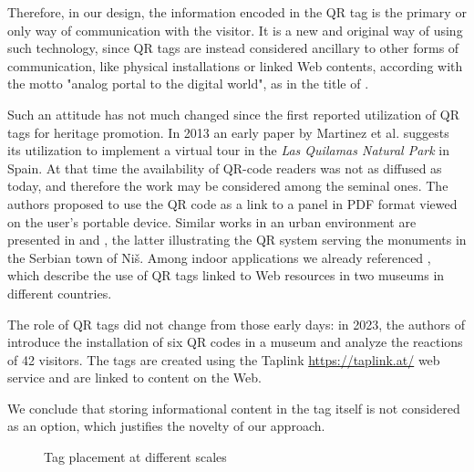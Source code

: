 \documentclass[sustainability,article,submit,pdftex,moreauthors]{Definitions/mdpi}
\begin{document}
Therefore, in our design, the information encoded in the QR tag is the primary or only way of communication with the visitor. It is a new and original way of using such technology, since QR tags are instead considered ancillary to other forms of communication, like physical installations or linked Web contents, according with the motto "analog portal to the digital world", as in the title of \cite{bai12a}. 

Such an attitude has not much changed since the first reported utilization of QR tags for heritage promotion. In 2013 an early paper by Martinez et al. \cite{mar13a} suggests its utilization to implement a virtual tour in the {\em Las Quilamas Natural Park} in Spain. At that time the availability of QR-code readers was not as diffused as today, and therefore the work may be considered among the seminal ones. The authors proposed to use the QR code as a link to a panel in PDF format viewed on the user's portable device. Similar works in an urban environment are presented in \cite{fin13a} and \cite{tat15a}, the latter illustrating the QR system serving the monuments in the Serbian town of Niš. Among indoor applications we already referenced \cite{sol18a}, which describe the use of QR tags linked to Web resources in two museums in different countries.

The role of QR tags did not change from those early days: in 2023, the authors of \cite{pan23a} introduce the installation of six QR codes in a museum and analyze the reactions of 42 visitors. The tags are created using the Taplink \url{https://taplink.at/} web service and are linked to content on the Web. 

We conclude that storing informational content in the tag itself is not considered as an option, which justifies the novelty of our approach.

\begin{figure}
\hfill
{}
\caption{Tag placement at different scales}
\label{fig:TagPlacement}
\end{figure}
\end{document}
